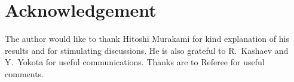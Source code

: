 \documentclass[12pt]{article}
\numberwithin{equation}{section}
\begin{document}


\section*{Acknowledgement}
The author would like to thank Hitoshi Murakami for  kind explanation
of his results and for
stimulating discussions.
He is also grateful to R.~Kashaev and Y.~Yokota for useful communications.
Thanks are to Referee for useful comments.

\newpage

%
%
%
%
%
\end{document}
